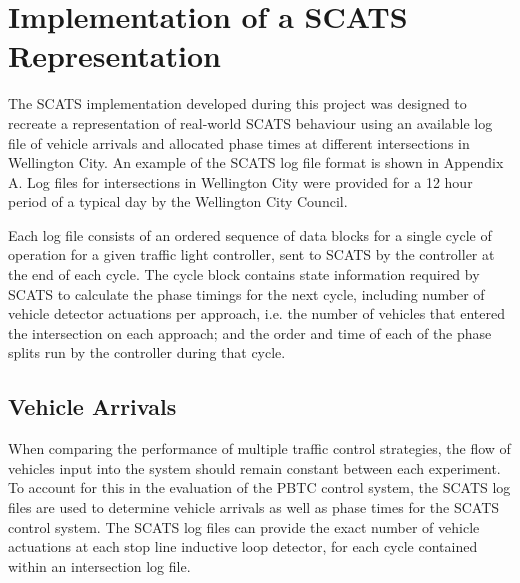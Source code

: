 \section{Implementation of a SCATS Representation}

The SCATS implementation developed during this project was designed to recreate a representation of real-world SCATS behaviour using an available log file of vehicle arrivals and allocated phase times at different intersections in Wellington City. An example of the SCATS log file format is shown in Appendix A. Log files for intersections in Wellington City were provided for a 12 hour period of a typical day by the Wellington City Council.

Each log file consists of an ordered sequence of data blocks for a single cycle of operation for a given traffic light controller, sent to SCATS by the controller at the end of each cycle. The cycle block contains state information required by SCATS to calculate the phase timings for the next cycle, including number of vehicle detector actuations per approach, i.e. the number of vehicles that entered the intersection on each approach; and the order and time of each of the phase splits run by the controller during that cycle. 


\subsection{Vehicle Arrivals}


When comparing the performance of multiple traffic control strategies, the flow of vehicles input into the system should remain constant between each experiment. To account for this in the evaluation of the PBTC control system, the SCATS log files are used to determine vehicle arrivals as well as phase times for the SCATS control system. The SCATS log files can provide the exact number of vehicle actuations at each stop line inductive loop detector, for each cycle contained within an intersection log file. 

